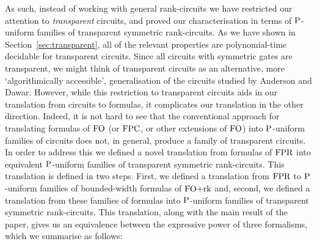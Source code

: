 \documentclass[../paper.tex]{subfiles}
\begin{document}


As such, instead of working with general rank-circuits we have restricted our
attention to \emph{transparent} circuits, and proved our characterisation in
terms of $\mathrm{P}$-uniform families of transparent symmetric rank-circuits. As we
have shown in Section~\ref{sec:transparent}, all of the relevant properties are
polynomial-time decidable for transparent circuits. Since all circuits with
symmetric gates are transparent, we might think of transparent circuits as an
alternative, more `algorithmically accessible', generalisation of the circuits
studied by Anderson and Dawar. However, while this restriction to transparent
circuits aids in our translation from circuits to formulas, it complicates our
translation in the other direction. Indeed, it is not hard to see that the
conventional approach for translating formulas of $\text{\upshape FO}$ (or $\text{\upshape FPC}$, or other
extensions of $\text{\upshape FO}$) into $\mathrm{P}$-uniform families of circuits does not, in
general, produce a family of transparent circuits. In order to address this we
defined a novel translation from formulas of $\text{\upshape FPR}$ into equivalent
$\mathrm{P}$-uniform families of transparent symmetric rank-circuits. This translation
is defined in two steps. First, we defined a translation from $\text{\upshape FPR}$ to
$\mathrm{P}$-uniform families of bounded-width formulas of $\text{\upshape FO+rk}$ and, second, we
defined a translation from these families of formulas into $\mathrm{P}$-uniform
families of transparent symmetric rank-circuits. This translation, along with
the main result of the paper, gives us an equivalence between the expressive
power of three formalisms, which we summarise as follows:
\end{document}
